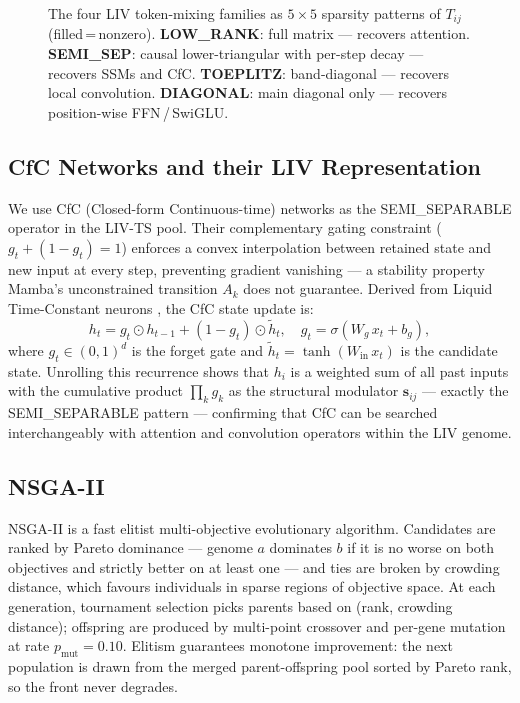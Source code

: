 \begin{figure}[t]
{%
}
\caption{The four LIV token-mixing families as $5{\times}5$ sparsity patterns of $T_{ij}$ (filled\,=\,nonzero).
  \textbf{LOW\_RANK}: full matrix — recovers attention.
  \textbf{SEMI\_SEP}: causal lower-triangular with per-step decay — recovers SSMs and CfC.
  \textbf{TOEPLITZ}: band-diagonal — recovers local convolution.
  \textbf{DIAGONAL}: main diagonal only — recovers position-wise FFN\,/\,SwiGLU.}
\label{fig:token_mixing}
\end{figure}

\subsection{CfC Networks and their LIV Representation}
\label{sec:cfc_liv}

We use CfC (Closed-form Continuous-time) networks \cite{hasani2021cfc} as the SEMI\_SEPARABLE operator in the LIV-TS pool.
Their complementary gating constraint ($g_t + (1{-}g_t)=1$) enforces a convex interpolation between retained state and new input at every step, preventing gradient vanishing — a stability property Mamba's unconstrained transition $A_k$ does not guarantee.
Derived from Liquid Time-Constant neurons \cite{hasani2022liquid}, the CfC state update is:
\begin{equation}
  h_t = g_t \odot h_{t-1} + (1 - g_t) \odot \tilde{h}_t,
  \quad g_t = \sigma(W_g\,x_t + b_g),
  \label{eq:cfc_recurrence}
\end{equation}
where $g_t \in (0,1)^d$ is the forget gate and $\tilde{h}_t = \tanh(W_{\mathrm{in}}\,x_t)$ is the candidate state.
Unrolling this recurrence shows that $h_i$ is a weighted sum of all past inputs with the cumulative product $\prod_{k} g_k$ as the structural modulator $\mathbf{s}_{ij}$ — exactly the SEMI\_SEPARABLE pattern — confirming that CfC can be searched interchangeably with attention and convolution operators within the LIV genome.

\subsection{NSGA-II}

NSGA-II \cite{deb2002nsga2} is a fast elitist multi-objective evolutionary algorithm.
Candidates are ranked by Pareto dominance — genome $a$ dominates $b$ if it is no worse on both objectives and strictly better on at least one — and ties are broken by crowding distance, which favours individuals in sparse regions of objective space.
At each generation, tournament selection picks parents based on (rank, crowding distance); offspring are produced by multi-point crossover and per-gene mutation at rate $p_{\mathrm{mut}} = 0.10$.
Elitism guarantees monotone improvement: the next population is drawn from the merged parent-offspring pool sorted by Pareto rank, so the front never degrades.

